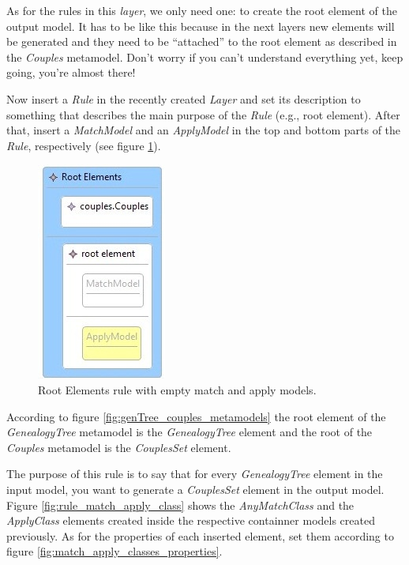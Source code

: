As for the rules in this \emph{layer}, we only need one: to create the root
element of the output model. It has to be like this because in the next layers
new elements will be generated and they need to be ``attached'' to the root
element as described in the \emph{Couples} metamodel. Don't worry if you can't
understand everything yet, keep going, you're almost there!

Now insert a \emph{Rule} in the recently created \emph{Layer} and set its
description to something that describes the main purpose of the \emph{Rule}
(e.g., root element). After that, insert a \emph{MatchModel} and an
\emph{ApplyModel} in the top and bottom parts of the \emph{Rule}, respectively
(see figure \ref{fig:root_elements_empty_rule}).

\begin{figure}[h]
\begin{center}
  \includegraphics[scale=0.7]{imgs/root_elements_empty_rule.jpg}
  \caption{Root Elements rule with empty match and apply models.}
  \label{fig:root_elements_empty_rule}
\end{center}
\end{figure}

According to figure \ref{fig:genTree_couples_metamodels} the root element of the
\emph{GenealogyTree} metamodel is the \emph{GenealogyTree} element and the root
of the \emph{Couples} metamodel is the \emph{CouplesSet} element.

The purpose of this rule is to say that for every \emph{GenealogyTree} element
in the input model, you want to generate a \emph{CouplesSet} element in the
output model. Figure \ref{fig:rule_match_apply_class} shows the
\emph{AnyMatchClass} and the \emph{ApplyClass} elements created inside the respective containner models
created previously. As for the properties of each inserted element, set them
according to figure \ref{fig:match_apply_classes_properties}.

